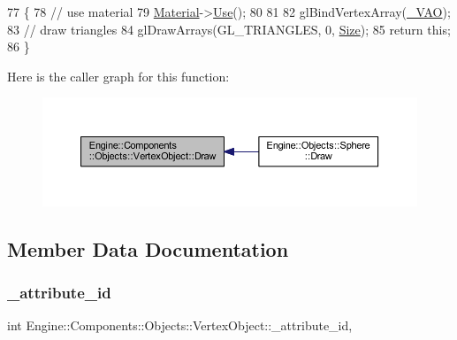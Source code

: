 \begin{DoxyCode}
77 \{
78     \textcolor{comment}{// use material}
79     \mbox{\hyperlink{classEngine_1_1Components_1_1Objects_1_1VertexObject_a86c1fced4cdc5e59a66a635390a17eca}{Material}}->\mbox{\hyperlink{classEngine_1_1Components_1_1Graphics_1_1Material_aef1dd6fbbf0268d4f3e6c371a2f1aa8d}{Use}}();
80 
81 
82     glBindVertexArray(\mbox{\hyperlink{classEngine_1_1Components_1_1Objects_1_1VertexObject_ae85ac9d5ded8f54d58feb7fb78e75130}{\_VAO}});
83     \textcolor{comment}{// draw triangles}
84     glDrawArrays(GL\_TRIANGLES, 0, \mbox{\hyperlink{classEngine_1_1Components_1_1Objects_1_1VertexObject_a13ec6e4a92520bdd1b33ad6de757cb92}{Size}});
85     \textcolor{keywordflow}{return} \textcolor{keyword}{this};
86 \}
\end{DoxyCode}
Here is the caller graph for this function\+:
\nopagebreak
\begin{figure}[H]
\begin{center}
\leavevmode
\includegraphics[width=350pt]{classEngine_1_1Components_1_1Objects_1_1VertexObject_a53a8f546ee082720579e2c33be6cedec_icgraph}
\end{center}
\end{figure}


\subsection{Member Data Documentation}
\mbox{\label{classEngine_1_1Components_1_1Objects_1_1VertexObject_a401aa1eb0254e57d8295c2287749eed5}} 
\subsubsection{\texorpdfstring{\+\_\+attribute\+\_\+id}{\_attribute\_id}}
{\footnotesize\ttfamily int Engine\+::\+Components\+::\+Objects\+::\+Vertex\+Object\+::\+\_\+attribute\+\_\+id\hspace{0.3cm}{\ttfamily [protected]}, {\ttfamily [inherited]}}



